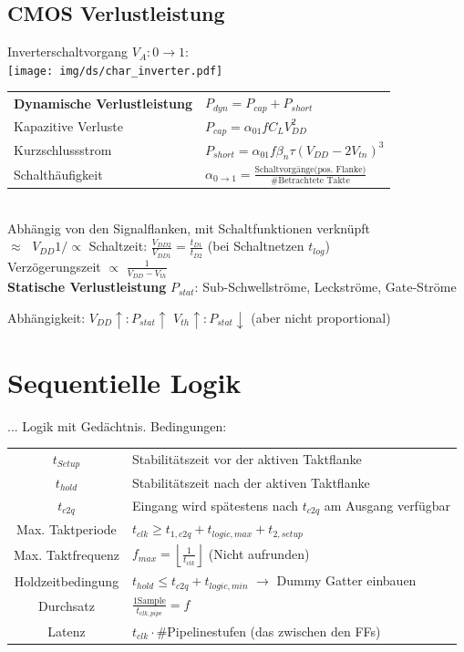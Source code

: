 \documentclass[6pt,a4paper]{scrartcl}
\renewcommand{\emph}[1]{\textsf{\textbf{#1}}}
\newcommand{\ra}[0]{\ensuremath{\rightarrow}} 									%
\begin{document}
\begin{multicols}{3}
	\subsection{CMOS Verlustleistung}
	Inverterschaltvorgang $V_A: 0 \ra 1$:\\
	\texttt{[image: img/ds/char\_inverter.pdf]}
	
	\begin{tabular}{ll}
		\emph{Dynamische Verlustleistung}	& $P_{dyn} = P_{cap} + P_{short}$\\
		\quad Kapazitive Verluste & $P_{cap} = \alpha_{01} f C_L V_{DD}^2$\\
		\quad Kurzschlussstrom	& $P_{short} = \alpha_{01} f \beta_n \tau (V_{DD} - 2V_{tn})^3$\\[0.8em]
		\quad Schalthäufigkeit & $\alpha_{0 \rightarrow 1} = \frac{\text{Schaltvorgänge(pos. Flanke)}}{\text{\# Betrachtete Takte}}$\\
	\end{tabular}\\
	
	Abhängig von den Signalflanken, mit Schaltfunktionen verknüpft\\ 
	$\approx \;$ $V_{DD} 1/\propto $ Schaltzeit: $\frac{V_{DD2}}{V_{DD1}} = \frac{t_{D1}}{t_{D2}}$ (bei Schaltnetzen $t_{log}$)\\
	Verzögerungszeit $\propto$ $\frac{1}{V_{DD} - V_{th}}$\\

	\emph{Statische Verlustleistung} $P_{stat}$: Sub-Schwellströme, Leckströme, Gate-Ströme
	
	Abhängigkeit: $V_{DD}\uparrow:P_{stat}\uparrow$ \qquad $V_{th}\uparrow:P_{stat}\downarrow$ \quad (aber nicht proportional)\\


\section{Sequentielle Logik}
... Logik mit Gedächtnis. Bedingungen: \\
\begin{tabular}{c | l}
$t_{Setup}$ & Stabilitätszeit vor der aktiven Taktflanke\\
$t_{hold}$ & Stabilitätszeit nach  der aktiven Taktflanke\\
$t_{c2q}$ & Eingang wird spätestens nach $t_{c2q}$ am Ausgang verfügbar\\
Max. Taktperiode &  $t_{clk} \ge t_{1,c2q} + t_{logic,max} + t_{2,setup}$  \\
 Max. Taktfrequenz & $f_{max} = \left\lfloor \frac{1}{t_{clk}} \right\rfloor$ \qquad (Nicht aufrunden) \\
 Holdzeitbedingung & $t_{hold} \le t_{c2q} + t_{logic,min}$  $\ra$ Dummy Gatter einbauen\\
 Durchsatz & $\frac{1 \text{Sample}}{t_{clk,pipe}} = f$ \\
 Latenz & $t_{clk} \cdot \#$Pipelinestufen (das zwischen den FFs) \\
\end{tabular}



\end{multicols}
\end{document}
